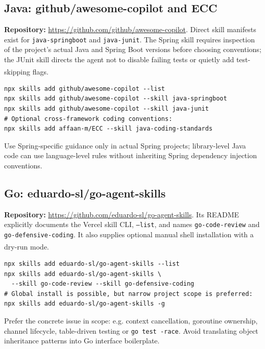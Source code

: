 \documentclass[11pt,letterpaper]{article}
\newcommand{\src}[1]{\textsuperscript{\textcolor{teal}{\cite{#1}}}}
\begin{document}
\subsection{Java: github/awesome-copilot and ECC}
\textbf{Repository:} \url{https://github.com/github/awesome-copilot}. Direct skill manifests exist for \texttt{java-springboot} and \texttt{java-junit}. The Spring skill requires inspection of the project's actual Java and Spring Boot versions before choosing conventions; the JUnit skill directs the agent not to disable failing tests or quietly add test-skipping flags.\src{javaspring,javajunit}
\begin{verbatim}
npx skills add github/awesome-copilot --list
npx skills add github/awesome-copilot --skill java-springboot
npx skills add github/awesome-copilot --skill java-junit
# Optional cross-framework coding conventions:
npx skills add affaan-m/ECC --skill java-coding-standards
\end{verbatim}
Use Spring-specific guidance only in actual Spring projects; library-level Java code can use language-level rules without inheriting Spring dependency injection conventions.

\subsection{Go: eduardo-sl/go-agent-skills}
\textbf{Repository:} \url{https://github.com/eduardo-sl/go-agent-skills}. Its README explicitly documents the Vercel skill CLI, \texttt{--list}, and names \texttt{go-code-review} and \texttt{go-defensive-coding}. It also supplies optional manual shell installation with a dry-run mode.\src{goskills}
\begin{verbatim}
npx skills add eduardo-sl/go-agent-skills --list
npx skills add eduardo-sl/go-agent-skills \
  --skill go-code-review --skill go-defensive-coding
# Global install is possible, but narrow project scope is preferred:
npx skills add eduardo-sl/go-agent-skills -g
\end{verbatim}
Prefer the concrete issue in scope: e.g. context cancellation, goroutine ownership, channel lifecycle, table-driven testing or \texttt{go test -race}. Avoid translating object inheritance patterns into Go interface boilerplate.
\end{document}
